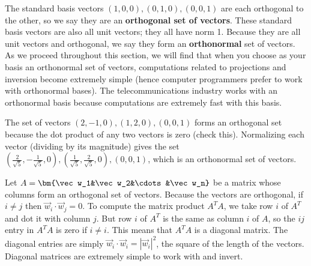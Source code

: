 The standard basis vectors $(1,0,0),(0,1,0),(0,0,1)$ are each orthogonal to the other, so we say they are an \textbf{orthogonal set of vectors}.
These standard basis vectors are also all unit vectors; they all have norm 1. 
Because they are all unit vectors and orthogonal, we say they form an \textbf{orthonormal} set of vectors. 
As we proceed throughout this section, we will find that when you choose as your basis an orthonormal set of vectors, computations related to projections and inversion become extremely simple (hence computer programmers prefer to work with orthonormal bases). 
The telecommunications industry works with an orthonormal basis because computations are extremely fast with this basis.

\begin{example}
The set of vectors $(2,-1,0), (1,2,0),(0,0,1)$ forms an orthogonal set because the dot product of any two vectors is zero (check this).  
Normalizing each vector (dividing by its magnitude) gives the set $(\frac{2}{\sqrt5},-\frac{1}{\sqrt5},0), (\frac{1}{\sqrt5},\frac{2}{\sqrt5},0),(0,0,1)$, which is an orthonormal set of vectors. 
\end{example}

Let $A = \bm{\vec w_1&\vec w_2&\cdots&\vec w_n}$ be a matrix whose columns form an orthogonal set of vectors. Because the vectors are orthogonal, if $i\neq j$ then $\vec w_i\cdot\vec w_j=0$. To compute the matrix product $A^T A$, we take row $i$ of $A^T$ and dot it with column $j$.  But row $i$ of $A^T$ is the same as column $i$ of $A$, so the $ij$ entry in $A^TA$ is zero if $i\neq i$.  This means that $A^TA$ is a diagonal matrix. The diagonal entries are simply $\vec w_i\cdot \vec w_i = |\vec w_i|^2$, the square of the length of the vectors. Diagonal matrices are extremely simple to work with and invert.

